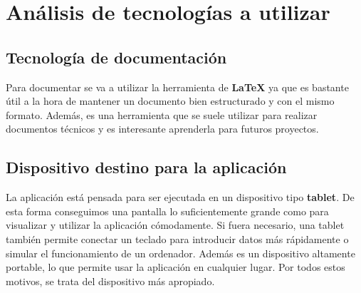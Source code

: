\chapter{Análisis de tecnologías a utilizar}
\label{chap:Technologies}

\section{Tecnología de documentación}

Para documentar se va a utilizar la herramienta de \textbf{LaTeX} ya que es bastante útil a la hora de mantener un documento bien estructurado y con el mismo formato. Además, es una herramienta que se suele utilizar para realizar documentos técnicos y es interesante aprenderla para futuros proyectos.  

\section{Dispositivo destino para la aplicación}

La aplicación está pensada para ser ejecutada en un dispositivo tipo \textbf{tablet}. De esta forma conseguimos una pantalla lo suficientemente grande como para visualizar y utilizar la aplicación cómodamente. Si fuera necesario, una tablet también permite conectar un teclado para introducir datos más rápidamente o simular el funcionamiento de un ordenador. Además es un dispositivo altamente portable, lo que permite usar la aplicación en cualquier lugar. Por todos estos motivos, se trata del dispositivo más apropiado. 